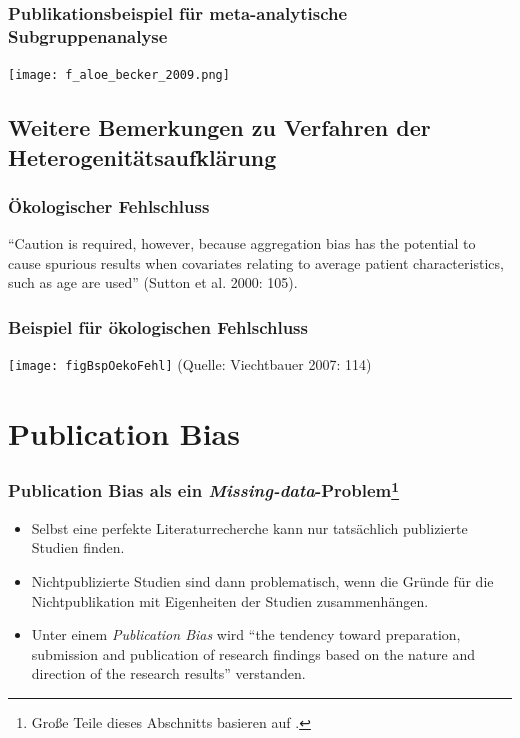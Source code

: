 \begin{frame}[plain]\frametitle{{Publikationsbeispiel für meta-analytische Subgruppenanalyse}}
  \begin{center}
    \texttt{[image: f\_aloe\_becker\_2009.png]}
  \end{center}
  \citep[Quelle:][618]{aloe_teacher_2009}
\end{frame}



\subsection{Weitere Bemerkungen zu Verfahren der Heterogenitätsaufklärung}


\begin{frame}
  \frametitle{Ökologischer Fehlschluss}\label{ref:oekofehlschluss}
  "`Caution is required, however, because aggregation bias has the potential to
  cause spurious results when covariates relating to average patient
  characteristics, such as age are used"' (Sutton et al. 2000: 105).
\end{frame}


\begin{frame}[shrink = 5, plain]
  \frametitle{Beispiel für ökologischen Fehlschluss}
  \texttt{[image: figBspOekoFehl]}
\newline(Quelle: Viechtbauer 2007: 114)
\end{frame}





\section{Publication Bias}\label{sec:pubbias}


\begin{frame}\frametitle{Publication Bias als ein
    \emph{Missing-data}-Problem\protect\footnote{Große Teile dieses Abschnitts
      basieren auf \citet{weis_identification_2011}. }}
  \begin{itemize}
  \item Selbst eine perfekte Literaturrecherche kann nur tatsächlich publizierte Studien finden.
  \item Nichtpublizierte Studien sind dann problematisch, wenn die Gründe für
    die Nichtpublikation mit Eigenheiten der Studien zusammenhängen.
  \item Unter einem \emph{Publication Bias} wird \enquote{the tendency toward
      preparation, submission and publication of research findings based on the
      nature and direction of the research results} \citep[13]{dickersin_publication_2005} verstanden.
  \end{itemize}
\end{frame}


